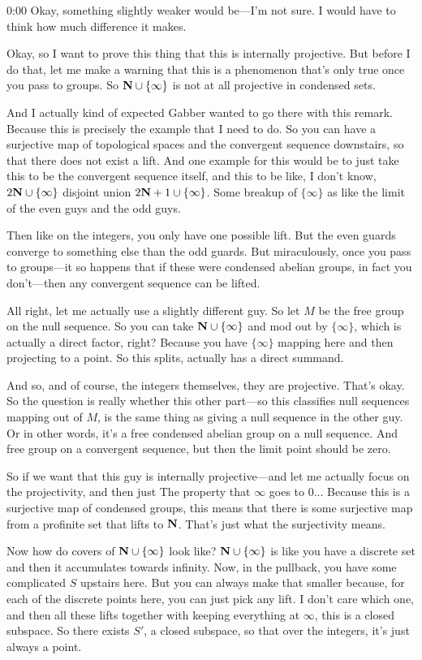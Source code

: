 \begin{unfinished}{0:00}
Okay, something slightly weaker would be---I'm not sure. I would have to think how much difference it makes.

Okay, so I want to prove this thing that this is internally projective. But before I do that, let me make a warning that this is a phenomenon that's only true once you pass to groups. So $\mathbf N \cup \{\infty\}$ is not at all projective in condensed sets.

And I actually kind of expected Gabber wanted to go there with this remark. Because this is precisely the example that I need to do. So you can have a surjective map of topological spaces and the convergent sequence downstairs, so that there does not exist a lift. And one example for this would be to just take this to be the convergent sequence itself, and this to be like, I don't know, $2\mathbf N \cup \{\infty\}$ disjoint union $2\mathbf N+1 \cup \{\infty\}$. Some breakup of $\{\infty\}$ as like the limit of the even guys and the odd guys.

Then like on the integers, you only have one possible lift. But the even guards converge to something else than the odd guards. But miraculously, once you pass to groups---it so happens that if these were condensed abelian groups, in fact you don't---then any convergent sequence can be lifted.

All right, let me actually use a slightly different guy. So let $M$ be the free group on the null sequence. So you can take $\mathbf N \cup \{\infty\}$ and mod out by $\{\infty\}$, which is actually a direct factor, right? Because you have $\{\infty\}$ mapping here and then projecting to a point. So this splits, actually has a direct summand.

And so, and of course, the integers themselves, they are projective. That's okay. So the question is really whether this other part---so this classifies null sequences mapping out of $M$, is the same thing as giving a null sequence in the other guy. Or in other words, it's a free condensed abelian group on a null sequence. And free group on a convergent sequence, but then the limit point should be zero.

So if we want that this guy is internally projective---and let me actually focus on the projectivity, and then just
The property that $\infty$ goes to $0$... Because this is a surjective map of condensed groups, this means that there is some surjective map from a profinite set that lifts to $\mathbf N$. That's just what the surjectivity means.

Now how do covers of $\mathbf N \cup \{\infty\}$ look like? $\mathbf N \cup \{\infty\}$ is like you have a discrete set and then it accumulates towards infinity. Now, in the pullback, you have some complicated $S$ upstairs here. But you can always make that smaller because, for each of the discrete points here, you can just pick any lift. I don't care which one, and then all these lifts together with keeping everything at $\infty$, this is a closed subspace. So there exists $S'$, a closed subspace, so that over the integers, it's just always a point.


\end{unfinished}
